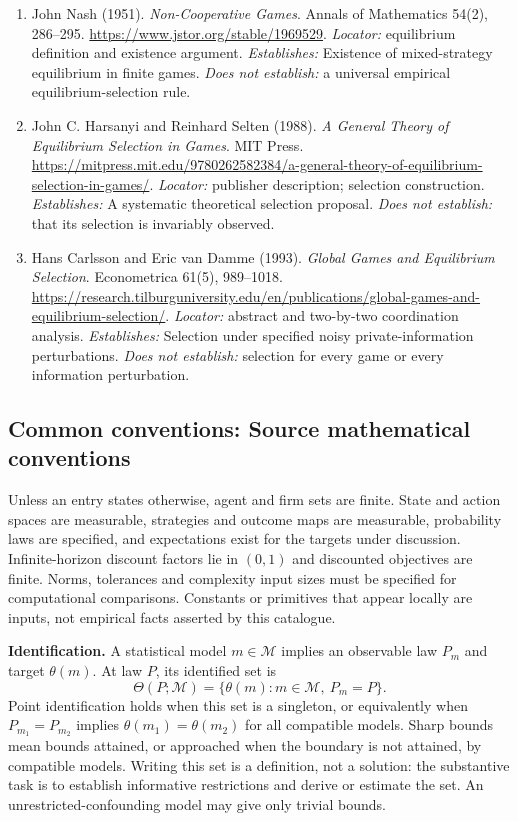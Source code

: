\documentclass[11pt,a4paper]{article}
\begin{document}
\begin{enumerate}

\item[S1] John Nash (1951). \emph{Non-Cooperative Games}. Annals of Mathematics 54(2), 286--295. \url{https://www.jstor.org/stable/1969529}. \textit{Locator:} equilibrium definition and existence argument. \textit{Establishes:} Existence of mixed-strategy equilibrium in finite games. \textit{Does not establish:} a universal empirical equilibrium-selection rule.

\item[S2] John C. Harsanyi and Reinhard Selten (1988). \emph{A General Theory of Equilibrium Selection in Games}. MIT Press. \url{https://mitpress.mit.edu/9780262582384/a-general-theory-of-equilibrium-selection-in-games/}. \textit{Locator:} publisher description; selection construction. \textit{Establishes:} A systematic theoretical selection proposal. \textit{Does not establish:} that its selection is invariably observed.

\item[S3] Hans Carlsson and Eric van Damme (1993). \emph{Global Games and Equilibrium Selection}. Econometrica 61(5), 989--1018. \url{https://research.tilburguniversity.edu/en/publications/global-games-and-equilibrium-selection/}. \textit{Locator:} abstract and two-by-two coordination analysis. \textit{Establishes:} Selection under specified noisy private-information perturbations. \textit{Does not establish:} selection for every game or every information perturbation.

\end{enumerate}

\subsection*{Common conventions: Source mathematical conventions}

Unless an entry states otherwise, agent and firm sets are finite. State and action spaces are measurable, strategies and outcome maps are measurable, probability laws are specified, and expectations exist for the targets under discussion. Infinite-horizon discount factors lie in $(0,1)$ and discounted objectives are finite. Norms, tolerances and complexity input sizes must be specified for computational comparisons. Constants or primitives that appear locally are inputs, not empirical facts asserted by this catalogue.

\textbf{Identification.} A statistical model $m\in\mathcal M$ implies an observable law $P_m$ and target $\theta(m)$. At law $P$, its identified set is
\[
\Theta(P;\mathcal M)=\{\theta(m):m\in\mathcal M,\ P_m=P\}.
\]
Point identification holds when this set is a singleton, or equivalently when $P_{m_1}=P_{m_2}$ implies $\theta(m_1)=\theta(m_2)$ for all compatible models. Sharp bounds mean bounds attained, or approached when the boundary is not attained, by compatible models. Writing this set is a definition, not a solution: the substantive task is to establish informative restrictions and derive or estimate the set. An unrestricted-confounding model may give only trivial bounds.
\end{document}
